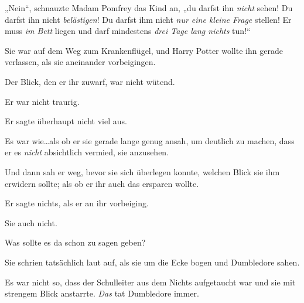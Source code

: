 
„Nein“, schnauzte Madam Pomfrey das Kind an, „du darfst ihn \emph{nicht} sehen! Du darfst ihn nicht \emph{belästigen}! Du darfst ihm nicht \emph{nur eine kleine Frage} stellen! Er muss \emph{im Bett} liegen und darf mindestens \emph{drei Tage lang nichts} tun!“


Sie war auf dem Weg zum Krankenflügel, und Harry Potter wollte ihn gerade verlassen, als sie aneinander vorbeigingen.

Der Blick, den er ihr zuwarf, war nicht wütend.

Er war nicht traurig.

Er sagte überhaupt nicht viel aus.

Es war wie…als ob er sie gerade lange genug ansah, um deutlich zu machen, dass er es \emph{nicht} absichtlich vermied, sie anzusehen.

Und dann sah er weg, bevor sie sich überlegen konnte, welchen Blick sie ihm erwidern sollte; als ob er ihr auch das ersparen wollte.

Er sagte nichts, als er an ihr vorbeiging.

Sie auch nicht.

Was sollte es da schon zu sagen geben?


Sie schrien tatsächlich laut auf, als sie um die Ecke bogen und Dumbledore sahen.

Es war nicht so, dass der Schulleiter aus dem Nichts aufgetaucht war und sie mit strengem Blick anstarrte. \emph{Das} tat Dumbledore immer.

